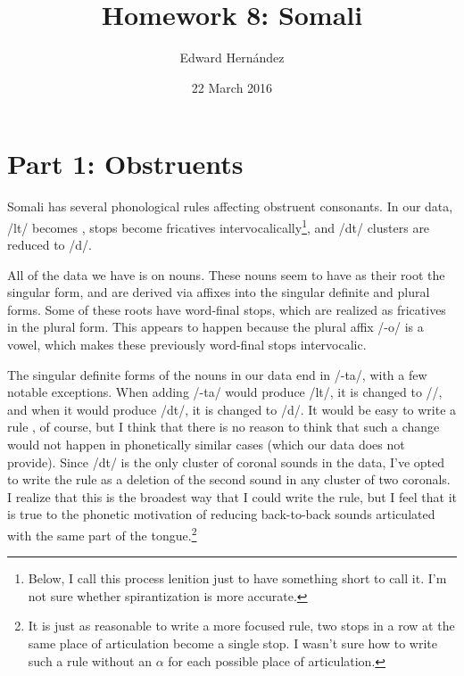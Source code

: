 \documentclass[doc,12pt]{apa6}
\begin{document}
\title{Homework 8: Somali}
\author{Edward Hern\'{a}ndez}
\date{22 March 2016}
\maketitle

\section{Part 1: Obstruents}

Somali has several phonological rules affecting obstruent consonants.  In our
data, /lt/ becomes , stops become fricatives
intervocalically\footnote{Below, I call this process lenition just to have
	something short to call it. I'm not sure whether spirantization is more
accurate.}, and /dt/ clusters are reduced to /d/.

All of the data we have is on nouns. These nouns seem to have as their root the
singular form, and are derived via affixes into the singular definite and
plural forms. Some of these roots have word-final stops, which are realized as
fricatives in the plural form. This appears to happen because the plural affix
/-o/ is a vowel, which makes these previously word-final stops intervocalic.

The singular definite forms of the nouns in our data end in /-ta/, with a few
notable exceptions. When adding /-ta/ would produce /lt/, it is changed to
//, and when it would produce /dt/, it is changed to /d/.  It would
be easy to write a rule , of course, but I think that there is no
reason to think that such a change would not happen in phonetically similar
cases (which our data does not provide).  Since /dt/ is the only cluster of
coronal sounds in the data, I've opted to write the rule as a deletion of the
second sound in any cluster of two coronals. I realize that this is the
broadest way that I could write the rule, but I feel that it is true to the
phonetic motivation of reducing back-to-back sounds articulated with the same
part of the tongue.\footnote{It is just as reasonable to write a more focused
rule, two stops in a row at the same place of articulation become a single
stop. I wasn't sure how to write such a rule without an $\alpha$ for each
possible place of articulation.}
\end{document}
